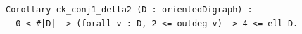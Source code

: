 \begin{lstlisting}[language=Rocq]
Corollary ck_conj1_delta2 (D : orientedDigraph) :
  0 < #|D| -> (forall v : D, 2 <= outdeg v) -> 4 <= ell D.
\end{lstlisting}
